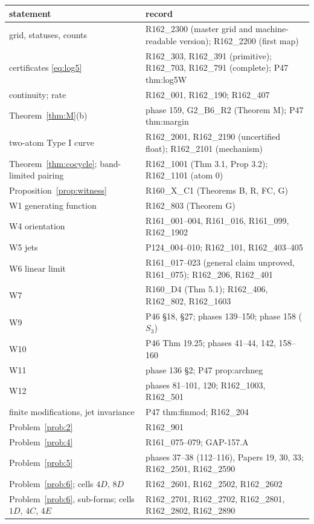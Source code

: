 \documentclass[11pt]{amsart}
\theoremstyle{definition}
\theoremstyle{remark}
\begin{document}
\begin{center}\small
\begin{tabularx}{\textwidth}{@{}p{5.2cm}Y@{}}
\toprule
statement & record \\
\midrule
grid, statuses, counts & R162\_2300 (master grid and machine-readable version); R162\_2200 (first map) \\
certificates \eqref{eq:log5} & R162\_303, R162\_391 (primitive); R162\_703, R162\_791 (complete); P47 thm:log5W \\
continuity; rate & R162\_001, R162\_190; R162\_407 \\
Theorem~\ref{thm:M}(b) & phase 159, G2\_B6\_R2 (Theorem M); P47 thm:margin \\
two-atom Type I curve & R162\_2001, R162\_2190 (uncertified float); R162\_2101 (mechanism) \\
Theorem~\ref{thm:cocycle}; band-limited pairing & R162\_1001 (Thm 3.1, Prop 3.2); R162\_1101 (atom 0) \\
Proposition~\ref{prop:witness} & R160\_X\_C1 (Theorems B, R, FC, G) \\
W1 generating function & R162\_803 (Theorem G) \\
W4 orientation & R161\_001--004, R161\_016, R161\_099, R162\_1902 \\
W5 jets & P124\_004--010; R162\_101, R162\_403--405 \\
W6 linear limit & R161\_017--023 (general claim unproved, R161\_075); R162\_206, R162\_401 \\
W7 & R160\_D4 (Thm 5.1); R162\_406, R162\_802, R162\_1603 \\
W9 & P46 \S18, \S27; phases 139--150; phase 158 ($S_3$) \\
W10 & P46 Thm 19.25; phases 41--44, 142, 158--160 \\
W11 & phase 136 \S2; P47 prop:archneg \\
W12 & phases 81--101, 120; R162\_1003, R162\_501 \\
finite modifications, jet invariance & P47 thm:finmod; R162\_204 \\
Problem~\ref{prob:2} & R162\_901 \\
Problem~\ref{prob:4} & R161\_075--079; GAP-157.A \\
Problem~\ref{prob:5} & phases 37--38 (112--116), Papers 19, 30, 33; R162\_2501, R162\_2590 \\
Problem~\ref{prob:6}; cells $4D$, $8D$ & R162\_2601, R162\_2502, R162\_2602 \\
Problem~\ref{prob:6}, sub-forms; cells $1D$, $4C$, $4E$ & R162\_2701, R162\_2702, R162\_2801, R162\_2802, R162\_2890 \\

\end{tabularx}
\end{center}
\end{document}
